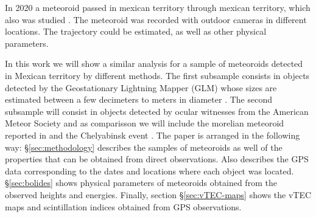 In 2020 a meteoroid passed in mexican territory through mexican territory, which also was studied \citep{Sergeeva:2020}. The meteoroid was recorded with outdoor cameras in different locations. The trajectory could be estimated, as well as other physical parameters.

In this work we will show a similar analysis for a sample of meteoroids detected in Mexican territory by different methods. The first subsample consists in objects detected by the Geostationary Lightning Mapper (GLM) whose sizes are estimated between a few decimeters to meters in diameter \citep{GOODMAN:2013, Jenniskens:2018, Rumpf:2019}. The second subsample will consist in objects detected by ocular witnesses from the American Meteor Society and as comparisson we will include the morelian meteoroid reported in \citet{Sergeeva:2020} and the Chelyabinsk event \citet{Yang:2014}. The paper is arranged in the following way: \S \ref{sec:methodology} describes the samples of meteoroids as well of the properties that can be obtained from direct observations. Also describes the GPS data corresponding to the dates and locations where each object was located. \S \ref{sec:bolides} shows physical parameters of meteoroids obtained from the observed heights and energies. Finally, section \S \ref{sec:vTEC-maps} shows the vTEC maps and scintillation indices obtained from GPS observations.  